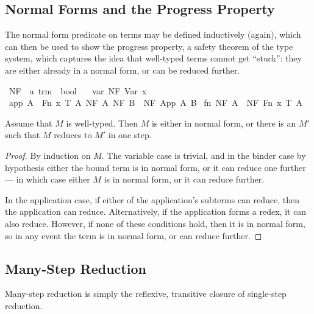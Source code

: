 \subsection{Normal Forms and the Progress Property}
The normal form predicate on terms may be defined inductively (again), which can then be used to show the progress property, a safety theorem of the type system, which captures the idea that well-typed terms cannot get ``stuck'': they are either already in a normal form, or can be reduced further.

\begin{implementation}
\isamarkupfalse%
\ NF\ {\isacharcolon}{\isacharcolon}\ {\isachardoublequoteopen}{\isacharprime}a\ trm\ {\isasymRightarrow}\ bool{\isachardoublequoteclose}\ \isanewline
\ \ var{\isacharcolon}\ {\isachardoublequoteopen}NF\ {\isacharparenleft}Var\ x{\isacharparenright}{\isachardoublequoteclose}\isanewline
{\isacharbar}\ app{\isacharcolon}\ {\isachardoublequoteopen}{\isasymlbrakk}A\ {\isasymnoteq}\ Fn\ x\ T\ A{\isacharprime}{\isacharsemicolon}\ NF\ A{\isacharsemicolon}\ NF\ B{\isasymrbrakk}\ {\isasymLongrightarrow}\ NF\ {\isacharparenleft}App\ A\ B{\isacharparenright}{\isachardoublequoteclose}\isanewline
{\isacharbar}\ fn{\isacharcolon}\ {\isachardoublequoteopen}NF\ A\ {\isasymLongrightarrow}\ NF\ {\isacharparenleft}Fn\ x\ T\ A{\isacharparenright}{\isachardoublequoteclose}\isanewline
\end{implementation}

\begin{theorem}
\label{theorem:progress}
Assume that \(M\) is well-typed.
Then \(M\) is either in normal form, or there is an \(M'\) such that \(M\) reduces to \(M'\) in one step.
\end{theorem}
\begin{proof}
By induction on \(M\).
The variable case is trivial, and in the binder case by hypothesis either the bound term is in normal form, or it can reduce one further --- in which case either \(M\) is in normal form, or it can reduce further.

In the application case, if either of the application's subterms can reduce, then the application can reduce.
Alternatively, if the application forms a redex, it can also reduce.
However, if none of these conditions hold, then it is in normal form, so in any event the term is in normal form, or can reduce further.
\end{proof}

\subsection{Many-Step Reduction}
Many-step reduction is simply the reflexive, transitive closure of single-step reduction.

